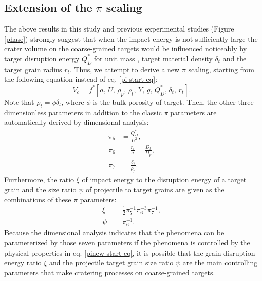 \documentclass[3p,authoryear]{elsarticle}
\begin{document}
\subsection{Extension of the $\pi$ scaling} \label{sec:extension-pi}
The above results in this study and previous experimental studies (Figure \ref{phase}) strongly suggest that when the impact energy is not sufficiently large the crater volume on the coarse-grained targets would be influenced noticeably by target disruption energy $Q_D^*$ for unit mass \citep[e.g.][]{fujiwara1980b, benz1999}, target material density $\delta_t$ and the target grain radius $r_t$.
Thus, we attempt to derive a new $\pi$ scaling, starting from the following equation instead of eq. \eqref{pi-start-eq}:
\begin{equation}
	V_c=f^*[a,\,U,\,\rho_p,\, \rho_t,\,Y,\, g,\, Q_D^*, \,\delta_t,\, r_t]. \label{pinew-start-eq}
\end{equation}
Note that $\rho_t=\phi \delta_t$, where $\phi$ is the bulk porosity of target.
Then, the other three dimensionless parameters in addition to the classic $\pi$ parameters are automatically derived by dimensional analysis:
\begin{align}
	\pi_5&=\frac{Q_D^*}{U^2},\\
	\pi_6&=\frac{r_t}{a}=\frac{D_t}{D_p},\\
	\pi_7&=\frac{\delta_t}{\rho_p}.
\end{align}
Furthermore, the ratio $\xi$ of impact energy to the disruption energy of a target grain and the size ratio $\psi$ of projectile to target grains are given as the combinations of these $\pi$ parameters:
\begin{align}
	\xi&=\frac{1}{2}\pi_5^{-1}\pi_6^{-3}\pi_7^{-1},\\
	\psi&=\pi_6^{-1}.
\end{align}
Because the dimensional analysis indicates that the phenomena can be parameterized by those seven parameters if the phenomena is controlled by the physical properties in eq. \eqref{pinew-start-eq}, it is possible that the grain disruption energy ratio $\xi$ and the projectile target grain size ratio $\psi$ are the main controlling parameters that make cratering processes on coarse-grained targets.
\end{document}
